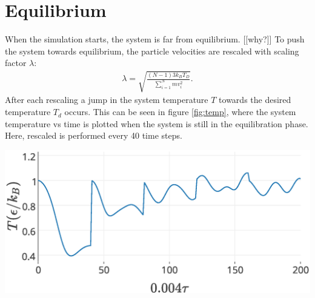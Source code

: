 \section{Equilibrium}
When the simulation starts, the system is far from equilibrium. [[why?]] To push the system towards equilibrium, the particle velocities are rescaled with scaling factor $\lambda$:
\begin{gather}\label{eq:rescale}
    \lambda=\sqrt{\frac{(N-1)3k_BT_D}{\sum_{i=1}^{N} mv_i^{2}}}.
\end{gather} After each rescaling a jump in the system temperature $T$ towards the desired temperature $T_d$ occurs. This can be seen in figure \ref{fig:temp}, where the system temperature vs time is plotted when the system is still in the equilibration phase. Here, rescaled is performed every 40 time steps.
\begin{Figure}
 \centering
 \includegraphics[width=1\linewidth]{equilibration.eps}
 \label{fig:temp}
\end{Figure}
